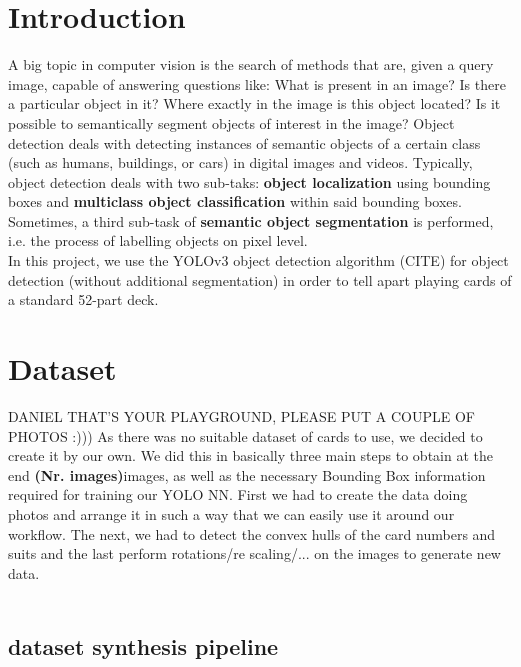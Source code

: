 \documentclass[a4paper]{article}
\begin{document}
\section{Introduction}
A big topic in computer vision is the search of methods that are, given a query image, capable of answering questions like: What is present in an image? Is there a particular object in it? Where exactly in the image is this object located? Is it possible to semantically segment objects of interest in the image?
Object detection deals with detecting instances of semantic objects of a certain class (such as humans, buildings, or cars) in digital images and videos. Typically, object detection deals with two sub-taks: \textbf{object localization} using bounding boxes and \textbf{multiclass object classification} within said bounding boxes.
Sometimes, a third sub-task of \textbf{semantic object segmentation} is performed, i.e. the process of labelling objects on pixel level.\\
In this project, we use the YOLOv3 object detection algorithm (CITE) for object detection (without additional segmentation) in order to tell apart playing cards of a standard 52-part deck.

\section{Dataset}
DANIEL THAT'S YOUR PLAYGROUND, PLEASE PUT A COUPLE OF PHOTOS :)))
As there was no suitable dataset of cards to use, we decided to create it by our own.  We did this in basically three main steps to obtain at the end \textbf{(Nr. images)}images,  as well as the necessary  Bounding Box information required for training our YOLO NN.   First we had to create the data doing photos and arrange it in such a way that  we can easily use it around our workflow.  The next, we had to detect the convex hulls of the card numbers and suits and the last perform rotations/re scaling/... on the images to generate new data.\\ \\
\subsection{dataset synthesis pipeline}
\end{document}
